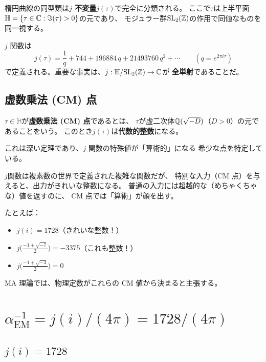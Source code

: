 楕円曲線の同型類は\textbf{$j$ 不変量}$j(\tau)$で完全に分類される。
ここで$\tau$は上半平面$\mathbb{H} = \{\tau \in \mathbb{C} : \Im(\tau) > 0\}$の元であり、
モジュラー群$\mathrm{SL}_2(\mathbb{Z})$の作用で同値なものを同一視する。

$j$ 関数は
\begin{equation}
j(\tau) = \frac{1}{q} + 744 + 196884\,q + 21493760\,q^2 + \cdots
\qquad (q = e^{2\pi i \tau})
\end{equation}
で定義される。重要な事実は、$j:\mathbb{H}/\mathrm{SL}_2(\mathbb{Z}) \to \mathbb{C}$が
\textbf{全単射}であることだ。

\subsection{虚数乗法 (CM) 点}

\begin{dfnbox}[CM 点の定義]
$\tau \in \mathbb{H}$が\textbf{虚数乗法 (CM) 点}であるとは、
$\tau$が虚二次体$\mathbb{Q}(\sqrt{-D})$（$D > 0$）の元であることをいう。
このとき$j(\tau)$は\textbf{代数的整数}になる。

これは深い定理であり、$j$ 関数の特殊値が「算術的」になる
希少な点を特定している。
\end{dfnbox}

\begin{hsbox}
$j$関数は複素数の世界で定義された複雑な関数だが、
特別な入力（CM 点）を与えると、出力がきれいな整数になる。
普通の入力には超越的な（めちゃくちゃな）値を返すのに、
CM 点では「算術」が顔を出す。

たとえば：
\begin{itemize}[nosep]
\item $j(i) = 1728$（きれいな整数！）
\item $j\!\bigl(\tfrac{-1+\sqrt{-7}}{2}\bigr) = -3375$（これも整数！）
\item $j\!\bigl(\tfrac{-1+\sqrt{-3}}{2}\bigr) = 0$
\end{itemize}
MA 理論では、物理定数がこれらの CM 値から決まると主張する。
\end{hsbox}

\section{$\alpha_{\mathrm{EM}}^{-1} = j(i)/(4\pi) = 1728/(4\pi)$}
\label{sec:alpha-EM}

\subsection{$j(i) = 1728$}

